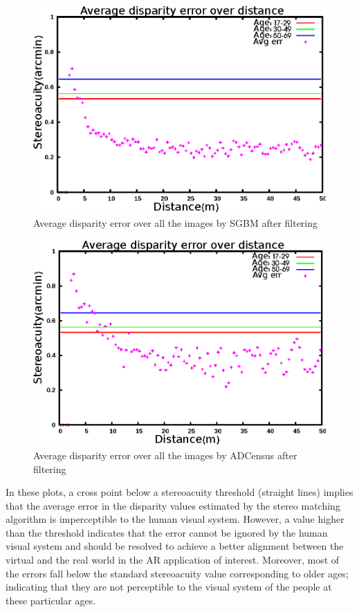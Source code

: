 \begin{figure}[H]
\centering
\includegraphics[scale=0.95]{sgbmmsk3}
\caption{Average disparity error over all the images by SGBM after filtering}
\label{fig:mskmapsgbm3}
\end{figure} 
\begin{figure}[H]
\centering
\includegraphics[scale=0.95]{adcenmsk3}
\caption{Average disparity error over all the images by ADCensus after filtering}
\label{fig:mskmapadc3}
\end{figure} 

In these plots, a cross point below a stereoacuity threshold (straight lines) implies that the average error in the disparity values estimated 
by the stereo matching 
algorithm is imperceptible to the human visual system. However, a value higher than the threshold indicates that
the error cannot be ignored by the human visual system and should be resolved to achieve a better alignment between the virtual and the 
real world in the AR application of interest. Moreover, most of the errors
fall below the standard stereoacuity value corresponding to older ages; indicating that they are not perceptible to the visual system of the people at these 
particular ages.

